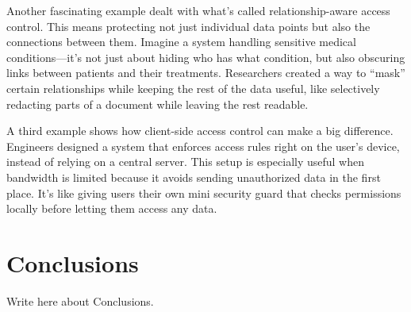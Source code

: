 \documentclass[runningheads]{llncs}
\begin{document}
Another fascinating example dealt with what’s called relationship-aware access control. This means protecting not just individual data points but also the connections between them. Imagine a system handling sensitive medical conditions—it’s not just about hiding who has what condition, but also obscuring links between patients and their treatments. Researchers created a way to “mask” certain relationships while keeping the rest of the data useful, like selectively redacting parts of a document while leaving the rest readable.

A third example shows how client-side access control can make a big difference. Engineers designed a system that enforces access rules right on the user’s device, instead of relying on a central server. This setup is especially useful when bandwidth is limited because it avoids sending unauthorized data in the first place. It’s like giving users their own mini security guard that checks permissions locally before letting them access any data.

\section{Conclusions}
Write here about Conclusions.
\end{document}

